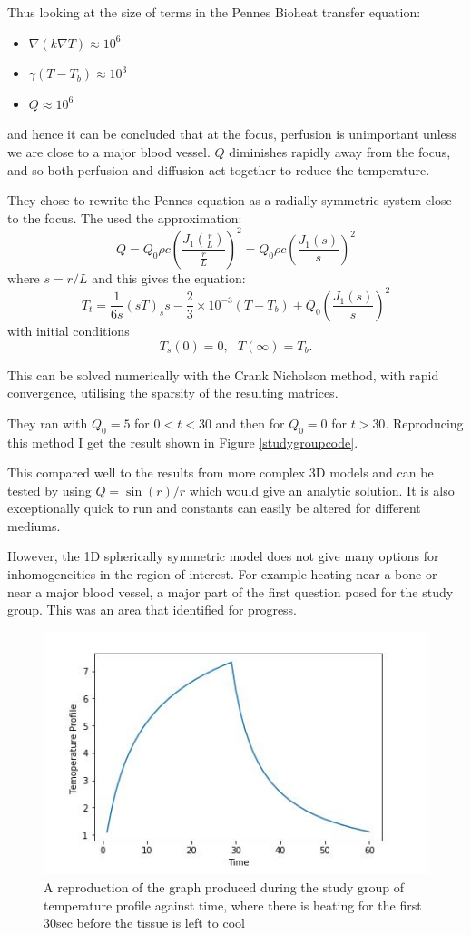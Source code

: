 \documentclass[11pt]{article} %
\begin{document}
 	Thus looking at the size of terms in the Pennes Bioheat transfer equation:
 	\begin{itemize}
 		\item $\nabla (k\nabla T) \approx 10^6$
 		\item $ \gamma (T-T_b) \approx 10^3$
 		\item $ Q \approx 10^6$
 	\end{itemize}
 and hence it can be concluded that at the focus, perfusion is unimportant unless we are close to a major blood vessel.  $ Q $ diminishes rapidly away from the focus, and so both perfusion and diffusion act together to reduce the temperature. 
 
 They chose to rewrite the Pennes equation as a radially symmetric system close to the focus. The used the approximation: 
 \begin{equation}
 Q=Q_0 \rho c \left(\frac{J_1\left(\frac{r}{L}\right)}{\frac{r}{L}}\right)^2= Q_0\rho c \left(\frac{J_1(s)}{s}\right)^2
 \end{equation}
 where $s=r/L$ and this gives the equation:
 \begin{equation}
 T_t=\frac{1}{6s}(sT)_ss-\frac{2}{3}\times 10^{-3}(T-T_b)+Q_0 \left(\frac{J_1(s)}{s}\right)^2
 \end{equation}
 with initial conditions $$ T_s(0)=0 , \ \ \ T(\infty)=T_b .$$
 
 This can be solved numerically with the Crank Nicholson method, with rapid convergence,  utilising the sparsity of the resulting matrices. 
 
 They ran with $Q_0=5$ for $0<t<30$ and then for $Q_0=0$ for $t>30$. Reproducing this method I get the result shown in Figure \ref{studygroupcode}.  
 
 This compared well to the results from more complex 3D models and can be tested by using $ Q=\sin(r)/r $ which would give an analytic solution. It is also exceptionally quick to run and constants can easily be altered for different mediums. 
 
 However, the 1D spherically symmetric model does not give many options for inhomogeneities in the region of interest. For example heating near a bone or near a major blood vessel, a major part of the first question posed for the study group. This was an area that identified for progress. 
 \begin{figure}
 	\centering
 	\includegraphics[width=0.7\linewidth]{Report_images/studygroupcode}
 	\caption{A reproduction of the graph produced during the study group of temperature profile against time, where there is heating for the first 30sec before the tissue is left to cool}
 	\label{fig:studygroupcode}
 \end{figure}
\end{document}
